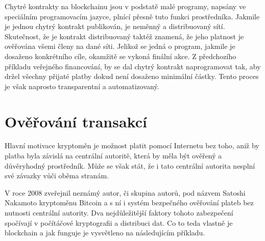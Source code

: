 Chytré kontrakty na blockchainu jsou v podstatě malé programy, napsány ve speciálním programovacím jazyce, plnící přesně tuto funkci prostředníka.
Jakmile je jednou chytrý kontrakt publikován, je neměnný a distribuovaný sítí. Skutečnost, že je kontrakt distribuovaný
taktéž znamená, že jeho platnost je ověřována všemi členy na dané síti.
Jelikož se jedná o program, jakmile je dosaženo konkrétního cíle, okamžitě se vykoná finální akce. Z předchozího příkladu veřejného
financování, by se dal chytrý kontrakt naprogramovat tak, aby držel všechny přijaté platby dokud není dosaženo minimální částky.
Tento proces je však naprosto transparentní a automatizovaný.


\section{Ověřování transakcí}
\label{sec:BlockchainSecurity}
Hlavní motivace kryptoměn je možnost platit pomocí Internetu bez toho, aniž by platba byla závislá na centrální autoritě, která by měla
být ověřený a důvěryhodný prostředník. Může se však stát, že i tato centrální autorita nesplní své závazky vůči oběma stranám.

V roce 2008 zveřejnil neznámý autor, či skupina autorů, pod názvem Satoshi Nakamoto kryptoměnu Bitcoin a s ní i systém bezpečného
ověřování plateb bez nutnosti centrální autority. Dva nejdůležitější faktory tohoto zabezpečení spočívají v počítáčové kryptografii
a distribuci dat. Co to teda vlastně je blockchain a jak funguje je vysvětleno na následujícím příkladu.

